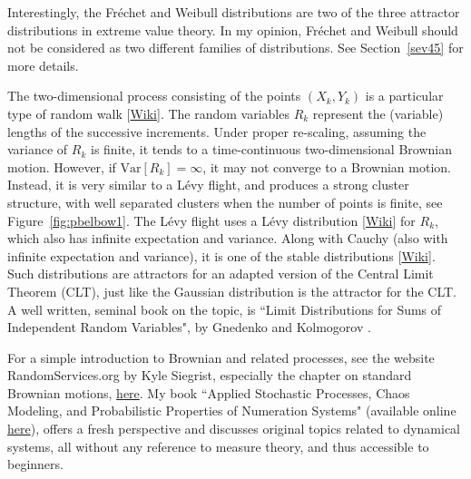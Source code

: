 \documentclass[10pt]{article}
\begin{document}
Interestingly, the Fréchet and Weibull distributions are two of the three 
\textcolor{index}{attractor distributions} in \textcolor{index}{extreme value theory}. In my opinion, Fréchet and Weibull should not be considered as two different families of distributions. See Section~\ref{sev45} for more details.

The two-dimensional process consisting of the points $(X_k,Y_k)$ is a particular type of \textcolor{index}{random walk} 
[\href{https://en.wikipedia.org/wiki/Random_walk}{Wiki}]. The random variables $R_k$ represent the (variable) lengths of the successive increments. Under proper re-scaling, assuming the variance of $R_k$ is finite, it tends to a time-continuous
two-dimensional Brownian motion. However, if $\mbox{Var}[R_k]=\infty$, it may not converge to a Brownian motion. Instead, it is very similar to a 
\textcolor{index}{Lévy flight}, and produces a strong cluster structure, with well separated clusters when the number of points is finite, see Figure~\ref{fig:pbelbow1}. The 
Lévy flight uses a \textcolor{index}{Lévy distribution} 
[\href{https://bit.ly/3rV7mrq}{Wiki}] for $R_k$, which also has infinite expectation and variance. Along with 
\textcolor{index}{Cauchy} (also with infinite expectation and variance), it is one of the \textcolor{index}{stable distributions} [\href{https://en.wikipedia.org/wiki/Stable_distribution}{Wiki}]. Such distributions are attractors 
for an adapted version of the \textcolor{index}{Central Limit Theorem} (CLT), just like the Gaussian distribution is the attractor
for the CLT. A well written, seminal book on the topic, is ``Limit Distributions for Sums of Independent Random Variables", by Gnedenko and Kolmogorov \cite{gk1954}.

For a simple introduction to Brownian and related processes, see the website RandomServices.org by Kyle Siegrist, especially the chapter on
standard Brownian motions, \href{https://www.randomservices.org/random/brown/Standard.html}{here}. My
book ``Applied Stochastic Processes, Chaos Modeling, and Probabilistic Properties of Numeration Systems" \cite{vgdyn} (available online 
\href{https://github.com/VincentGranville/Stochastic-Processes/blob/master/README.md}{here}), offers a fresh perspective and discusses original topics related to dynamical systems, all without any reference to measure theory, and thus accessible to beginners.  \\
\end{document}
